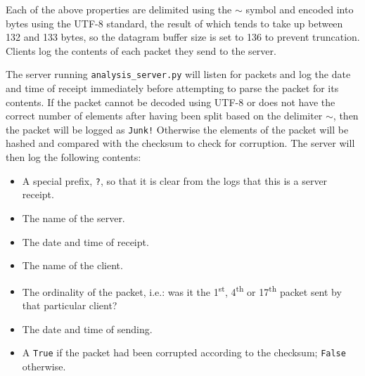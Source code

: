 Each of the above properties are delimited using the \texttt{$\sim$} symbol and encoded into bytes using the UTF-8
standard\cite{utf8}, the result of which tends to take up between 132 and 133 bytes, so the datagram buffer size is
set to 136 to prevent truncation. Clients log the contents of each packet they send to the server.

The server running \texttt{analysis\_server.py} will listen for packets and log the date and time of receipt
immediately before attempting to parse the packet for its contents. If the packet cannot be decoded using UTF-8 or
does not have the correct number of elements after having been split based on the delimiter \texttt{$\sim$}, then the
packet will be logged as \texttt{Junk!} Otherwise the elements of the packet will be hashed and compared with the
checksum to check for corruption. The server will then log the following contents:
\begin{itemize}
    \item A special prefix, \texttt{?}, so that it is clear from the logs that this is a server receipt.
    \item The name of the server.
    \item The date and time of receipt.
    \item The name of the client.
    \item The ordinality of the packet, i.e.: was it the 1\textsuperscript{st}, 4\textsuperscript{th} or
    17\textsuperscript{th} packet sent by that particular client?
    \item The date and time of sending.
    \item A \texttt{True} if the packet had been corrupted according to the checksum; \texttt{False} otherwise.
\end{itemize}

